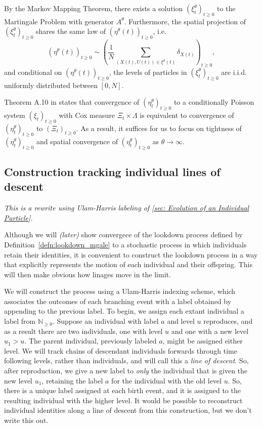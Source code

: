 \documentclass[12pt]{article}
\newcommand{\IN}{\mathbb N}
\newcommand{\comment}[1]{{\color{blue} \it #1}}
\begin{document}
By the Markov Mapping Theorem,
there exists a solution $(\xi^{\theta}_t)_{t \geq 0}$
to the Martingale Problem with generator $A^{\theta}$.
Furthermore,
the spatial projection of $(\xi^{\theta}_t)_{t \geq 0}$
shares the same law of $(\eta^{\theta}(t))_{t \geq 0}$,
i.e.
$$(\eta^{\theta}(t))_{t \geq 0}
\sim \left(\frac{1}{N}\sum\limits_{(X(t),U(t))\in \xi^{\theta}(t)} \delta_{X(t)}\right)_{t \geq 0},$$
and conditional on 
$(\eta^{\theta}(t))_{t \geq 0}$,
the levels of particles in $(\xi^{\theta}_t)_{t \geq 0}$
are i.i.d. uniformly distributed between $[0,N]$.

Theorem A.10 in \cite{kurtz/rodrigues:2011}
states that convergence of $(\eta^{\theta}_t)_{t \geq 0}$
to a conditionally Poisson system $(\xi_t)_{t \geq 0}$
with Cox measure $\Xi_t \times \Lambda$
is equivalent to convergence of
$(\eta^{\theta}_t)_{t \geq 0}$ to $(\Xi_t)_{t \geq 0}$.
As a result, it suffices for us to focus on
tightness of $(\eta^{\theta}_t)_{t \geq 0}$
and spatial convergence of $(\eta^{\theta}_t)_{t \geq 0}$
as $\theta \to \infty$.


\subsection{Construction tracking individual lines of descent}

\comment{This is a rewrite using Ulam-Harris labeling
of \ref{sec: Evolution of an Individual Particle}.}

Although we will \comment{(later)} show convergece of the lookdown process
defined by Definition~\ref{defn:lookdown_mgale}
to a stochastic process in which individuals retain their identities,
it is convenient to construct the lookdown process
in a way that explicitly represents the motion of each individual and their offspring.
This will then make obvious how linages move in the limit.

We will construct the process using a Ulam-Harris indexing scheme,
which associates the outcomes of each branching event with a label obtained
by appending to the previous label.
To begin, we assign each extant individual a label from $\IN_{\ge 0}$.
Suppose an individual with label $a$ and level $u$ reproduces,
and as a result there are two individuals, one with level $u$ and one with a new level $u_1 > u$.
The parent individual, previously labeled $a$, might be assigned either level.
We will track chains of descendant individuals forwards through time
following levels, rather than individuals, and will call this a \emph{line of descent}.
So, after reproduction, we give a new label to \emph{only} the individual
that is given the new level $u_1$,
retaining the label $a$ for the individual with the old level $u$.
So, there is a unique label assigned at each birth event,
and it is assigned to the resulting individual with the higher level.
It would be possible to reconstruct individual identities along a line of descent
from this construction,
but we don't write this out.
\end{document}
